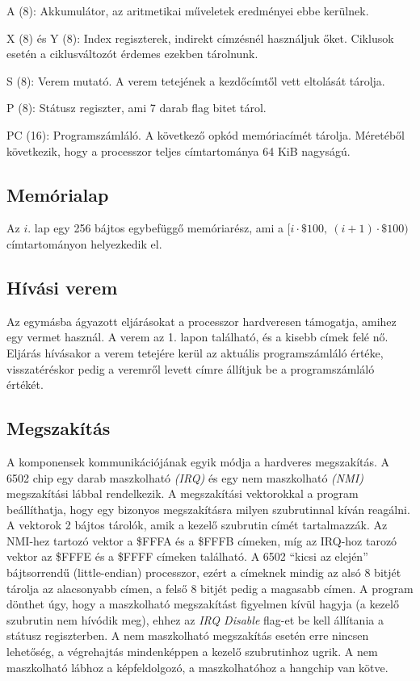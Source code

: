 \begin{compactdesc}
	\item[A (8):] Akkumulátor, az aritmetikai műveletek eredményei ebbe kerülnek.
	\item[X (8) és Y (8):] 
	Index regiszterek, indirekt címzésnél használjuk őket.
	Ciklusok esetén a ciklusváltozót érdemes ezekben tárolnunk.
	\item[S (8):] 
	Verem mutató. A verem tetejének a kezdőcímtől vett eltolását tárolja.
	\item[P (8):]
	Státusz regiszter, ami 7 darab flag bitet tárol.
	\item[PC (16):]
	Programszámláló. 
	A következő opkód memóriacímét tárolja.
	Méretéből következik, hogy a processzor teljes címtartománya 64 KiB nagyságú.
\end{compactdesc}


\subsection{Memórialap}
Az $i$. lap egy 256 bájtos egybefüggő memóriarész, ami a $ [i \cdot \$100, \: (i+1) \cdot \$100) $ címtartományon helyezkedik el.

\subsection{Hívási verem}
Az egymásba ágyazott eljárásokat a processzor hardveresen támogatja, amihez egy vermet használ.
A verem az 1. lapon található, és a kisebb címek felé nő.
Eljárás hívásakor a verem tetejére kerül az aktuális programszámláló értéke, 
visszatéréskor pedig a veremről levett címre állítjuk be a programszámláló értékét.

\subsection{Megszakítás}
A komponensek kommunikációjának egyik módja a hardveres megszakítás.
A 6502 chip egy darab maszkolható \emph{(IRQ)} és egy nem maszkolható \emph{(NMI)} megszakítási lábbal rendelkezik.
A megszakítási vektorokkal a program beállíthatja, hogy egy bizonyos megszakításra milyen szubrutinnal kíván reagálni. A vektorok 2 bájtos tárolók, amik a kezelő szubrutin címét tartalmazzák. Az NMI-hez tartozó vektor a \$FFFA és a \$FFFB címeken, míg az IRQ-hoz tarozó vektor az \$FFFE és a \$FFFF címeken található. A 6502 ``kicsi az elején'' bájtsorrendű (little-endian) processzor, ezért a címeknek mindig az alsó 8 bitjét tárolja az alacsonyabb címen, a felső 8 bitjét pedig a magasabb címen.
A program dönthet úgy, hogy a maszkolható megszakítást figyelmen kívül hagyja (a kezelő szubrutin nem hívódik meg), ehhez az \emph{IRQ Disable} flag-et be kell állítania a státusz regiszterben. A nem maszkolható megszakítás esetén erre nincsen lehetőség, a végrehajtás mindenképpen a kezelő szubrutinhoz ugrik.
A nem maszkolható lábhoz a képfeldolgozó, a maszkolhatóhoz a hangchip van kötve.

